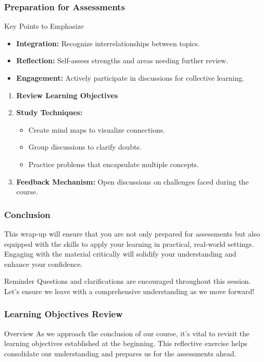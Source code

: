 \documentclass{beamer}
\begin{document}
\begin{frame}[fragile]
    \frametitle{Preparation for Assessments}
    \begin{block}{Key Points to Emphasize}
        \begin{itemize}
            \item \textbf{Integration:} Recognize interrelationships between topics.
            \item \textbf{Reflection:} Self-assess strengths and areas needing further review.
            \item \textbf{Engagement:} Actively participate in discussions for collective learning.
        \end{itemize}
    \end{block}
    
    \begin{enumerate}
        \item \textbf{Review Learning Objectives}
        \item \textbf{Study Techniques:}
            \begin{itemize}
                \item Create mind maps to visualize connections.
                \item Group discussions to clarify doubts.
                \item Practice problems that encapsulate multiple concepts.
            \end{itemize}
        \item \textbf{Feedback Mechanism:} Open discussions on challenges faced during the course.
    \end{enumerate}
\end{frame}

\begin{frame}[fragile]
    \frametitle{Conclusion}
    This wrap-up will ensure that you are not only prepared for assessments but also equipped with the skills to apply your learning in practical, real-world settings. Engaging with the material critically will solidify your understanding and enhance your confidence.
    
    \begin{block}{Reminder}
        Questions and clarifications are encouraged throughout this session. Let’s ensure we leave with a comprehensive understanding as we move forward!
    \end{block}
\end{frame}

\begin{frame}[fragile]
    \frametitle{Learning Objectives Review}
    \begin{block}{Overview}
        As we approach the conclusion of our course, it’s vital to revisit the learning objectives established at the beginning. This reflective exercise helps consolidate our understanding and prepares us for the assessments ahead.
    \end{block}
\end{frame}
\end{document}
